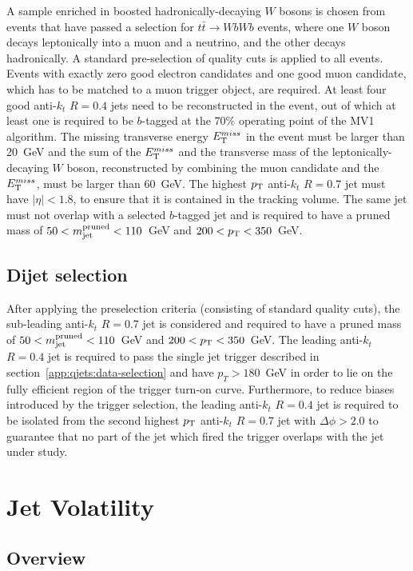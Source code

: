 A sample enriched in boosted hadronically-decaying $W$ bosons is chosen from events that have passed a selection for $t\bar{t}\to WbWb$ events, where one $W$ boson decays leptonically into a muon and a neutrino, and the other decays hadronically. A standard pre-selection of quality cuts is applied to all events. Events with exactly zero good electron candidates and one good muon candidate, which has to be matched to a muon trigger object, are required. At least four good anti-$k_t$ $R=0.4$ jets need to be reconstructed in the event, out of which at least one is required to be $b$-tagged at the $70\%$ operating point of the MV1 algorithm. The missing transverse energy $E_{\rm T}^{miss}$ in the event must be larger than 20~GeV and the sum of the $E_{\rm T}^{miss}$ and the transverse mass of the leptonically-decaying $W$ boson, reconstructed by combining the muon candidate and the $E_{\rm T}^{miss}$, must be larger than 60~GeV. The highest $p_{\rm T}$ anti-$k_t$ $R=0.7$ jet must have $|\eta|<1.8$, to ensure that it is contained in the tracking volume. The same jet must not overlap with a selected $b$-tagged jet and is required to have a pruned mass of $50<m_{\rm jet}^{\rm pruned}<110$~GeV and $200<p_{\rm T}<350$~GeV. 



\subsection{Dijet selection}


After applying the preselection criteria (consisting of standard quality cuts), the sub-leading anti-$k_t$ $R=0.7$ jet is considered and required to have a pruned mass of $50<m_{\rm jet}^{\rm pruned}<110$~GeV and $200<p_{\rm T}<350$~GeV. The leading anti-$k_t$ $R=0.4$ jet is required to pass the single jet trigger described in section~\ref{app:qjets:data-selection} and have $p_T > 180$~GeV in order to lie on the fully efficient region of the trigger turn-on curve. Furthermore, to reduce biases introduced by the trigger selection, the leading anti-$k_t$ $R=0.4$ jet is required to be isolated from the second highest $p_{\rm T}$ anti-$k_t$ $R=0.7$ jet with $\Delta \phi > 2.0$ to guarantee that no part of the jet which fired the trigger overlaps with the jet under study.

\section{Jet Volatility}


\subsection{Overview}
\label{app:qjets:jetvol:overview}


